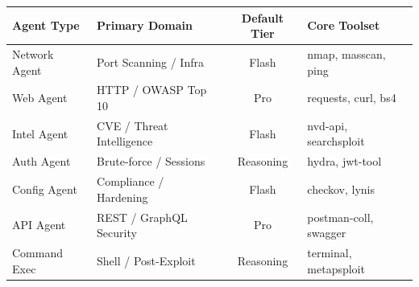 \begin{tabular}{l l c l}
\toprule
\textbf{Agent Type} & \textbf{Primary Domain} & \textbf{Default Tier} & \textbf{Core Toolset} \\
\midrule
Network Agent & Port Scanning / Infra & Flash & nmap, masscan, ping \\
Web Agent & HTTP / OWASP Top 10 & Pro & requests, curl, bs4 \\
Intel Agent & CVE / Threat Intelligence & Flash & nvd-api, searchsploit \\
Auth Agent & Brute-force / Sessions & Reasoning & hydra, jwt-tool \\
Config Agent & Compliance / Hardening & Flash & checkov, lynis \\
API Agent & REST / GraphQL Security & Pro & postman-coll, swagger \\
Command Exec & Shell / Post-Exploit & Reasoning & terminal, metapsploit \\
\bottomrule
\end{tabular}
